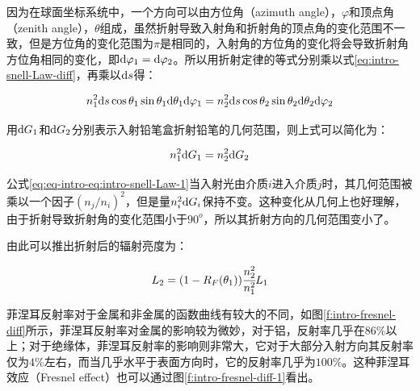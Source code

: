 \noindent 因为在球面坐标系统中，一个方向可以由方位角（azimuth angle），$\varphi$和顶点角（zenith angle），$\theta$组成，虽然折射导致入射角和折射角的顶点角的变化范围不一致，但是方位角的变化范围为$\pi$是相同的，入射角的方位角的变化将会导致折射角方位角相同的变化，即${\rm d}\varphi_1={\rm d}\varphi_2$。所以用折射定律的等式分别乘以式\ref{eq:intro-snell-Law-diff}，再乘以${\rm d}s$得：

\begin{equation}
	n^{2}_1{\rm d}s\cos\theta_1 \sin\theta_1 {\rm d}\theta_1 {\rm d}\varphi_1=n^{2}_2 {\rm d}s \cos\theta_2 \sin\theta_2 {\rm d}\theta_2 {\rm d}\varphi_2
\end{equation}

\noindent 用${\rm d}G_1$和${\rm d}G_2$分别表示入射铅笔盒折射铅笔的几何范围，则上式可以简化为：

\begin{equation}\label{eq:eq-intro-eq:intro-snell-Law-1}
	n^{2}_1 {\rm d}G_1=n^{2}_2 {\rm d}G_2
\end{equation}

\noindent 公式\ref{eq:eq-intro-eq:intro-snell-Law-1}当入射光由介质$i$进入介质$j$时，其几何范围被乘以一个因子$(n_j/n_i)^2$，但是量$n^2_i{\rm d}G_i$保持不变。这种变化从几何上也好理解，由于折射导致折射角的变化范围小于$90^o$，所以其折射方向的几何范围变小了。

由此可以推出折射后的辐射亮度为：

\begin{equation}\label{eq:intro-fresnel-refractiom}
	L_2=(1-R_F(\theta_1)) \cfrac{n^2_2}{n^2_1}L_1
\end{equation}

\noindent 菲涅耳反射率对于金属和非金属的函数曲线有较大的不同，如图\ref{f:intro-fresnel-diff}所示，菲涅耳反射率对金属的影响较为微妙，对于铝，反射率几乎在$86\%$以上；对于绝缘体，菲涅耳反射率的影响则非常大，它对于大部分入射方向其反射率仅为$4\%$左右，而当几乎水平于表面方向时，它的反射率几乎为$100\%$。这种菲涅耳效应（Fresnel effect）也可以通过图\ref{f:intro-fresnel-diff-1}看出。

